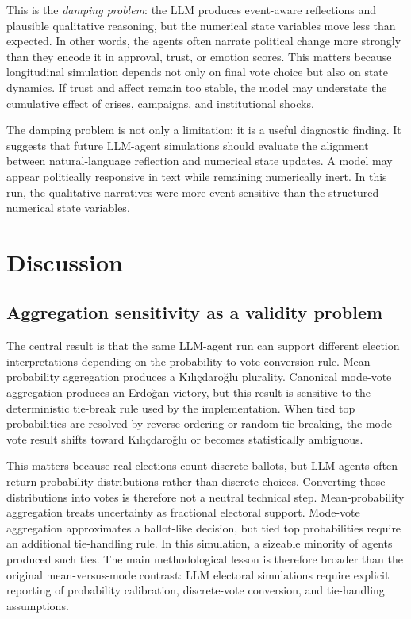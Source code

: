 \documentclass[pdflatex,sn-mathphys-num,iicol]{sn-jnl}
\begin{document}
This is the \textit{damping problem}: the LLM produces event-aware reflections
and plausible qualitative reasoning, but the numerical state variables move less
than expected. In other words, the agents often narrate political change more
strongly than they encode it in approval, trust, or emotion scores. This matters
because longitudinal simulation depends not only on final vote choice but also
on state dynamics. If trust and affect remain too stable, the model may
understate the cumulative effect of crises, campaigns, and institutional shocks.

The damping problem is not only a limitation; it is a useful diagnostic finding.
It suggests that future LLM-agent simulations should evaluate the alignment
between natural-language reflection and numerical state updates. A model may
appear politically responsive in text while remaining numerically inert. In this
run, the qualitative narratives were more event-sensitive than the structured
numerical state variables.


\section{Discussion}\label{sec:discussion}

\subsection{Aggregation sensitivity as a validity
problem}\label{subsec:agg-sensitivity}

The central result is that the same LLM-agent run can support different election
interpretations depending on the probability-to-vote conversion rule.
Mean-probability aggregation produces a Kılıçdaroğlu plurality. Canonical
mode-vote aggregation produces an Erdoğan victory, but this result is sensitive
to the deterministic tie-break rule used by the implementation. When tied top
probabilities are resolved by reverse ordering or random tie-breaking, the
mode-vote result shifts toward Kılıçdaroğlu or becomes statistically ambiguous.

This matters because real elections count discrete ballots, but LLM agents
often return probability distributions rather than discrete choices. Converting
those distributions into votes is therefore not a neutral technical step.
Mean-probability aggregation treats uncertainty as fractional electoral support.
Mode-vote aggregation approximates a ballot-like decision, but tied top
probabilities require an additional tie-handling rule. In this simulation, a
sizeable minority of agents produced such ties. The main methodological lesson
is therefore broader than the original mean-versus-mode contrast: LLM electoral
simulations require explicit reporting of probability calibration,
discrete-vote conversion, and tie-handling assumptions.
\end{document}
